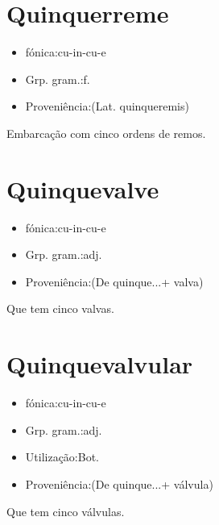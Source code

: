 \section{Quinquerreme}
\begin{itemize}
\item {fónica:cu-in-cu-e}
\end{itemize}
\begin{itemize}
\item {Grp. gram.:f.}
\end{itemize}
\begin{itemize}
\item {Proveniência:(Lat. \textunderscore quinqueremis\textunderscore )}
\end{itemize}
Embarcação com cinco ordens de remos.
\section{Quinquevalve}
\begin{itemize}
\item {fónica:cu-in-cu-e}
\end{itemize}
\begin{itemize}
\item {Grp. gram.:adj.}
\end{itemize}
\begin{itemize}
\item {Proveniência:(De \textunderscore quinque...\textunderscore  + \textunderscore valva\textunderscore )}
\end{itemize}
Que tem cinco valvas.
\section{Quinquevalvular}
\begin{itemize}
\item {fónica:cu-in-cu-e}
\end{itemize}
\begin{itemize}
\item {Grp. gram.:adj.}
\end{itemize}
\begin{itemize}
\item {Utilização:Bot.}
\end{itemize}
\begin{itemize}
\item {Proveniência:(De \textunderscore quinque...\textunderscore  + \textunderscore válvula\textunderscore )}
\end{itemize}
Que tem cinco válvulas.
